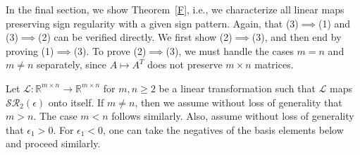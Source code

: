 \documentclass[11pt,reqno]{amsart}
\theoremstyle{plain}
\theoremstyle{definition}
\numberwithin{equation}{section}
\begin{document}
In the final section, we show Theorem~\ref{F}, i.e., we characterize all linear maps preserving sign regularity with a given sign pattern. Again, that (3)$\implies$(1) and (3)$\implies$(2) can be verified directly. We first show (2)$\implies$(3), and then end by proving (1)$\implies$(3). To prove (2)$\implies$(3), we must handle the cases $m=n$ and $m\neq n$ separately, since $A\mapsto A^T$ does not preserve $m\times n$ matrices.

Let $\mathcal{L}:\mathbb{R}^{m\times n}\to\mathbb{R}^{m\times n}$ for $m,n\geq2$ be a linear transformation such that $\mathcal{L}$ maps $\mathcal{SR}_2(\epsilon)$ onto itself. If $m\neq n$, then we assume without loss of generality that $m>n$. The case $m<n$ follows similarly. Also, assume without loss of generality that $\epsilon_1>0.$ For $\epsilon_1<0$, one can take the negatives of the  basis elements below and proceed similarly.
\end{document}
